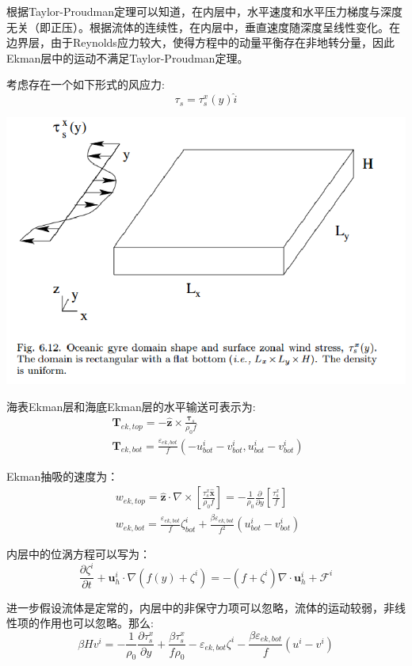 \documentclass{article}
\begin{document}
根据Taylor-Proudman定理可以知道，在内层中，水平速度和水平压力梯度与深度无关（即正压）。根据流体的连续性，在内层中，垂直速度随深度呈线性变化。在边界层，由于Reynolds应力较大，使得方程中的动量平衡存在非地转分量，因此Ekman层中的运动不满足Taylor-Proudman定理。

考虑存在一个如下形式的风应力:
$$\tau_s = \tau_s^x(y) \hat{i}$$
\begin{center}
    \includegraphics[width=0.5\linewidth]{Fig5_3.png}
\end{center}

海表Ekman层和海底Ekman层的水平输送可表示为:
\begin{align}
  & {{\mathbf{T}}_{ek,top}}=-\mathbf{\hat{z}}\times \frac{{{\mathbf{\tau }}_{s}}}{{{\rho }_{0}}f} \\ 
 & {{\mathbf{T}}_{ek,bot}}=\frac{{{\varepsilon }_{ek,bot}}}{f}(-u_{bot}^{i}-v_{bot}^{i},u_{bot}^{i}-v_{bot}^{i})\ \  
\end{align}

Ekman抽吸的速度为：
\begin{align}
  & {{w}_{ek,top}}=\mathbf{\hat{z}}\cdot \nabla \times \left[ \frac{\tau _{s}^{x}\mathbf{\hat{x}}}{{{\rho }_{0}}f} \right]=-\frac{1}{{{\rho }_{0}}}\frac{\partial }{\partial y}\left[ \frac{\tau _{s}^{x}}{f} \right] \\ 
 & {{w}_{ek,bot}}=\frac{{{\varepsilon }_{ek,bot}}}{f}\zeta _{bot}^{i}+\frac{\beta {{\varepsilon }_{ek,bot}}}{{{f}^{2}}}\left( u_{bot}^{i}-v_{bot}^{i} \right)\ \  
\end{align}

内层中的位涡方程可以写为：
$$\frac{\partial {{\zeta }^{i}}}{\partial t}+\mathbf{u}_{h}^{i}\cdot \nabla \left( f(y)+{{\zeta }^{i}} \right)=-\left( f+{{\zeta }^{i}} \right)\nabla \cdot \mathbf{u}_{h}^{i}+{{\mathcal{F}}^{i}}$$

进一步假设流体是定常的，内层中的非保守力项可以忽略，流体的运动较弱，非线性项的作用也可以忽略。那么:
$$\beta H{{v}^{i}}=-\frac{1}{{{\rho }_{0}}}\frac{\partial \tau _{s}^{x}}{\partial y}+\frac{\beta \tau _{s}^{x}}{f{{\rho }_{0}}}-{{\varepsilon }_{ek,bot}}{{\zeta }^{i}}-\frac{\beta {{\varepsilon }_{ek,bot}}}{f}({{u}^{i}}-{{v}^{i}})$$
\end{document}
